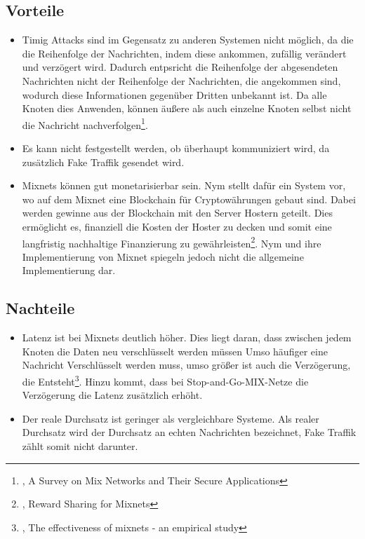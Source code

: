 \subsection{Vorteile}

\begin{itemize}
    \item Timig Attacks sind im Gegensatz zu anderen Systemen nicht möglich, da die die Reihenfolge der Nachrichten, indem diese ankommen, zufällig verändert und verzögert wird. Dadurch entpsricht die Reihenfolge der abgesendeten Nachrichten nicht der Reihenfolge der Nachrichten, die angekommen sind, wodurch diese Informationen gegenüber Dritten unbekannt ist. Da alle Knoten dies Anwenden, können äußere als auch einzelne Knoten selbst nicht die Nachricht nachverfolgen\footnote{\cite{MixNetworksSecureApplications}, A Survey on Mix Networks and Their Secure Applications}.
    \item Es kann nicht festgestellt werden, ob überhaupt kommuniziert wird, da zusätzlich Fake Traffik gesendet wird.
    \item Mixnets können gut monetarisierbar sein. Nym stellt dafür ein System vor, wo auf dem Mixnet eine Blockchain für Cryptowährungen gebaut sind. Dabei werden gewinne aus der Blockchain mit den Server Hostern geteilt. Dies ermöglicht es, finanziell die Kosten der Hoster zu decken und somit eine langfristig nachhaltige Finanzierung zu gewährleisten\footnote{\cite{RewardSharingForMixnets}, Reward Sharing for Mixnets}. Nym und ihre Implementierung von Mixnet spiegeln jedoch nicht die allgemeine Implementierung dar.
\end{itemize}

\subsection{Nachteile}

\begin{itemize}
    \item Latenz ist bei Mixnets deutlich höher. Dies liegt daran, dass zwischen jedem Knoten die Daten neu verschlüsselt werden müssen Umso häufiger eine Nachricht Verschlüsselt werden muss, umso größer ist auch die Verzögerung, die Entsteht\footnote{\cite{EffectivenessOfMixnets}, The effectiveness of mixnets - an empirical study}. Hinzu kommt, dass bei Stop-and-Go-MIX-Netze die Verzögerung die Latenz zusätzlich erhöht.
    \item Der reale Durchsatz ist geringer als vergleichbare Systeme. Als realer Durchsatz wird der Durchsatz an echten Nachrichten bezeichnet, Fake Traffik zählt somit nicht darunter.
\end{itemize}
